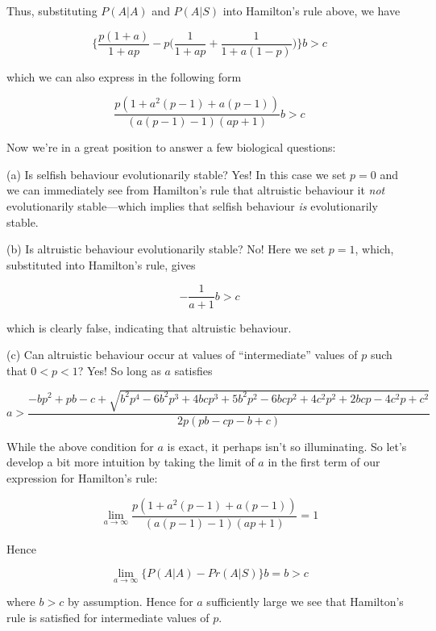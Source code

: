 \documentclass{article}
\begin{document}
Thus, substituting $P(A|A)$ and $P(A|S)$ into Hamilton's rule above, we have

\begin{equation*}
    \Bigg\{\frac{p (1 + a)}{1 + a p} - p \bigg(\frac{1}{1 + a p} + \frac{1}{1 + a (1 - p)}\bigg) \Bigg\} b > c
\end{equation*}

which we can also express in the following form

\begin{equation*}
    \frac{p (1 + a^2 (p - 1) + a (p - 1))}{(a (p - 1) - 1)(a p + 1)} b > c
\end{equation*}

Now we're in a great position to answer a few biological questions:

(a) Is selfish behaviour evolutionarily stable? Yes! In this case we set
$p = 0$ and we can immediately see from Hamilton's rule that altruistic
behaviour it \textit{not} evolutionarily stable---which implies that
selfish behaviour \textit{is} evolutionarily stable.

(b) Is altruistic behaviour evolutionarily stable? No! Here we set $p =
1$, which, substituted into Hamilton's rule, gives

\begin{equation*}
    - \frac{1}{a + 1} b > c
\end{equation*}

which is clearly false, indicating that altruistic behaviour.

(c) Can altruistic behaviour occur at values of ``intermediate'' values
of $p$ such that $0 < p < 1$? Yes! So long as $a$ satisfies

\begin{equation*}
    a > \frac{
        -b p^2 + p b - c + \sqrt{
            b^2 p^4 - 6 b^2 p^3 + 4 b c p^3 + 5 b^2 p^2 -6 b c p^2 + 4 c^2 p^2 + 2 b c p - 4 c^2 p + c^2
        }}{2 p (p b - c p - b + c)}
\end{equation*}

While the above condition for $a$ is exact, it perhaps isn't so
illuminating. So let's develop a bit more intuition by taking the limit
of $a$ in the first term of our expression for Hamilton's rule:

\begin{equation*}
    \lim_{a\to\infty} \frac{p (1 + a^2 (p - 1) + a (p - 1))}{(a (p - 1) - 1)(a p + 1)} = 1
\end{equation*}

Hence

\begin{equation*}
    \lim_{a\to\infty} \{P(A|A) - Pr(A|S)\} b = b > c
\end{equation*}

where $b > c$ by assumption. Hence for $a$ sufficiently large we see
that Hamilton's rule is satisfied for intermediate values of $p$.
\end{document}

